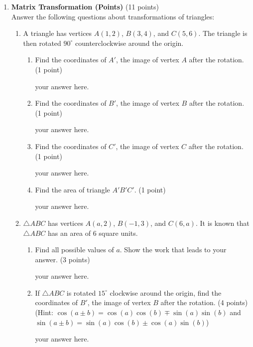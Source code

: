 \begin{enumerate}
  \newpage
  \item \textbf{Matrix Transformation (Points)} (11 points)\\
  Answer the following questions about transformations of triangles:
  \begin{enumerate}
    \item A triangle has vertices \(A(1, 2)\), \(B(3, 4)\), and \(C(5, 6)\).
    The triangle is then rotated \(90^{\circ}\) counterclockwise around the origin.
    \begin{enumerate}
      \item Find the coordinates of \(A'\), the image of vertex \(A\) after the rotation. (1 point)
      \begin{subanswer}
        your answer here.
      \end{subanswer}
      \item Find the coordinates of \(B'\), the image of vertex \(B\) after the rotation. (1 point)
      \begin{subanswer}
        your answer here.
      \end{subanswer}
      \item Find the coordinates of \(C'\), the image of vertex \(C\) after the rotation. (1 point)
      \begin{subanswer}
        your answer here.
      \end{subanswer}
      \item Find the area of triangle \(A'B'C'\). (1 point)
      \begin{subanswer}
        your answer here.
      \end{subanswer}
    \end{enumerate}

    \item $\triangle ABC$ has vertices $A(a, 2)$, $B(-1, 3)$, and $C(6, a)$. 
    It is known that $\triangle ABC$ has an area of 6 square units.
    \begin{enumerate}
      \item Find all possible values of $a$. Show the work that leads to your answer. (3 points)
      \begin{subanswer}
        your answer here.
      \end{subanswer}
      \item If $\triangle ABC$ is rotated $15^\circ$ clockwise around the origin, find 
      the coordinates of $B'$, the image of vertex $B$ after the rotation. (4 points)\\
      (Hint: $\cos(a \pm b) = \cos(a)\cos(b) \mp \sin(a)\sin(b)$ and $\sin(a \pm b) = 
      \sin(a)\cos(b) \pm \cos(a)\sin(b)$)
      \begin{subanswer}
        your answer here.
      \end{subanswer}
    \end{enumerate}
  \end{enumerate}








\end{enumerate}
